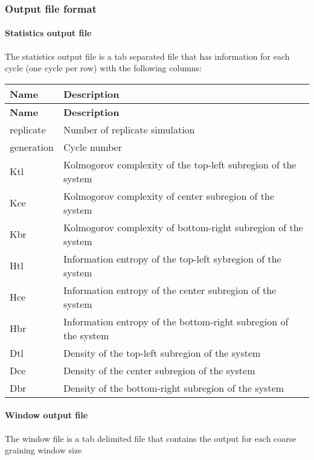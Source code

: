 \subsubsection*{Output file format}

\paragraph*{Statistics output file}

The statistics output file is a tab separated file that has information for each cycle (one cycle per row) with the following columns\+:

\tabulinesep=1mm
\begin{longtabu} spread 0pt [c]{*{2}{|X[-1]}|}
\hline
\rowcolor{\tableheadbgcolor}\textbf{ Name }&\textbf{ Description  }\\
\endfirsthead
\hline
\endfoot
\hline
\rowcolor{\tableheadbgcolor}\textbf{ Name }&\textbf{ Description  }\\
\endhead
replicate &Number of replicate simulation \\
generation&Cycle number \\
Ktl &Kolmogorov complexity of the top-\/left subregion of the system \\
Kce &Kolmogorov complexity of center subregion of the system \\
Kbr &Kolmogorov complexity of bottom-\/right subregion of the system \\
Htl &Information entropy of the top-\/left sybregion of the system \\
Hce &Information entropy of the center subregion of the system \\
Hbr &Information entropy of the bottom-\/right subregion of the system \\
Dtl &Density of the top-\/left subregion of the system \\
Dce &Density of the center subregion of the system \\
Dbr &Density of the bottom-\/right subregion of the system \\
\end{longtabu}
\paragraph*{Window output file}

The window file is a tab delimited file that contains the output for each coarse graining window size

